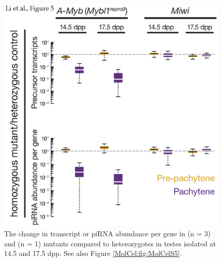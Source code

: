     \begin{figure} %
      \centering 
      \includegraphics{Figures/MolCel/MolCel2013_Fig5.eps}
      \caption[Pachytene piRNAs and Precursors Decrease in \amyb{} Mutant Testes]
      {
     	 The change in transcript or piRNA abundance per gene in \amyb{} (n = 3) and \miwi{} (n = 1) mutants compared to heterozygotes in testes isolated at 14.5 and 17.5 dpp. See also Figure \ref{MolCel:fig:MolCelS5}.
     	 }
      \label{MolCel:fig:MolCelF5}
   	  \end{figure}
